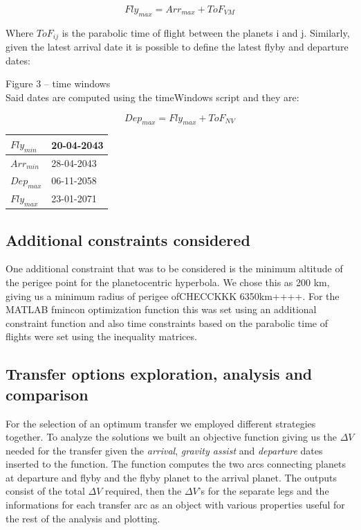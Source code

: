 \documentclass[11pt,a4paper]{report}
\begin{document}
\begin{equation*}
    Fly_{max}=Arr_{max}+ ToF_{VM}
\end{equation*}

Where $ToF_{ij}$ is the parabolic time of flight between the planets i and j.
Similarly, given the latest arrival date it is possible to define the latest flyby and departure dates:

Figure 3 – time windows\\
Said dates are computed using the timeWindows script and they are:

\begin{equation*}
    Dep_{max}=Fly_{max}+ ToF_{NV}
\end{equation*}

\begin{table}[H]
\centering
\begin{tabular}{|l|l|}
\hline
$Fly_{min}$ & 20-04-2043 \\ \hline
$Arr_{min}$ & 28-04-2043 \\ \hline
$Dep_{max}$ & 06-11-2058 \\ \hline
$Fly_{max}$ & 23-01-2071 \\ \hline
\end{tabular}
\end{table}



\subsection{Additional constraints considered}
One additional constraint that was to be considered is the minimum altitude of the perigee point for the planetocentric hyperbola. We chose this as 200 km, giving us a minimum radius of perigee ofCHECCKKK 6350km++++. For the MATLAB fmincon optimization function this was set using an additional constraint function and also time constraints based on the parabolic time of flights were set using the inequality matrices.

\subsection{Transfer options exploration, analysis and comparison}
For the selection of an optimum transfer we employed different strategies together.
To analyze the solutions we built an objective function giving us the $\Delta V$ needed for the transfer given the \emph{arrival}, \emph{gravity assist} and \emph{departure} dates inserted to the function. The function computes the two arcs connecting planets at departure and flyby and the flyby planet to the arrival planet. The outputs consist of the total $\Delta V$ required, then the $\Delta V$'s for the separate legs and the informations for each transfer arc as an object with various properties useful for the rest of the analysis and plotting.
\end{document}
